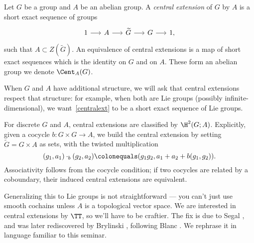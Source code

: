 \begin{defn} 
	Let $G$ be a group and $A$ be an abelian group. A \emph{central extension} of $G$ by $A$ is a short exact sequence
	of groups
	\begin{equation}\label{centralext}
		\begin{tikzcd}[sep=1.5em]
			1\arrow[r] & A\arrow[r] & \widetilde G\arrow[r] & G\arrow[r] & 1,
		\end{tikzcd}
	\end{equation}
	such that $A\subset Z(\widetilde G)$. An equivalence of central extensions is a map of short exact sequences which
	is the identity on $G$ and on $A$. These form an abelian group we denote $\Cent_A(G)$.  
\end{defn}

When $G$ and $A$ have additional structure, we will ask that central extensions respect that structure: for
example, when both are Lie groups (possibly infinite-dimensional), we want~\eqref{centralext} to be a short exact
sequence of Lie groups. 

For discrete $G$ and $A$, central extensions are classified by $\H^2(G;A)$. Explicitly, given a cocycle $b\colon
G\times G\to A$, we build the central extension by setting $\widetilde G = G\times A$ as sets, with the twisted
multiplication
\begin{equation}
	(g_1, a_1)\cdot_b (g_2, a_2) \colonequals (g_1g_2, a_1 + a_2 + b(g_1, g_2)).
\end{equation}
Associativity follows from the cocycle condition; if two cocycles are related by a coboundary, their induced
central extensions are equivalent.

Generalizing this to Lie groups is not straightforward --- you can't just use smooth cochains unless $A$ is a
topological vector space. We are interested in central extensions by $\TT$, so we'll have to be craftier. The fix is
due to Segal \cite{Seg70}, and was later rediscovered by Brylinski \cite{Bry00}, following Blanc \cite{Bla85}. We
rephrase it in language familiar to this seminar.

